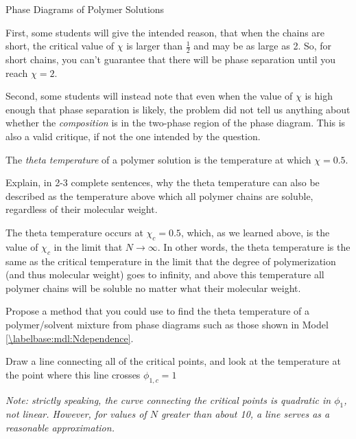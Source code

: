 \begin{activity}{Phase Diagrams of Polymer Solutions}
\begin{ctqs}
\begin{solution}[2.5in]
			First, some students will give the intended reason, that when the chains are short, the critical value of $\chi$ is larger than $\frac{1}{2}$ and may be as large as 2.  So, for short chains, you can't guarantee that there will be phase separation until you reach $\chi = 2$.
			
			Second, some students will instead note that even when the value of $\chi$ is high enough that phase separation is likely, the problem did not tell us anything about whether the \emph{composition} is in the two-phase region of the phase diagram.  This is also a valid critique, if not the one intended by the question.
		\end{solution}

\end{ctqs}


\begin{infobox}
	
	The \emph{theta temperature} of a polymer solution is the temperature at which $\chi=0.5$.
	
\end{infobox}


\begin{ctqs}

	\question Explain, in 2-3 complete sentences, why the theta temperature can also be described as the temperature above which all polymer chains are soluble, regardless of their molecular weight.
	
		\begin{solution}[2in]
			The theta temperature occurs at $\chi_c =0.5$, which, as we learned above, is the value of $\chi_c$ in the limit that $N\to\infty$.  In other words, the theta temperature is the same as the critical temperature in the limit that the degree of polymerization (and thus molecular weight) goes to infinity, and above this temperature all polymer chains will be soluble no matter what their molecular weight.
		\end{solution}
	
	\question Propose a method that you could use to find the theta temperature of a polymer/solvent mixture from phase diagrams such as those shown in Model \ref{\labelbase:mdl:Ndependence}.
	
		\begin{solution}[1.25in]
			Draw a line connecting all of the critical points, and look at the temperature at the point where this line crosses $\phi_{1,c} =1$
			
			\emph{Note: strictly speaking, the curve connecting the critical points is quadratic in $\phi_1$, not linear.  However, for values of $N$ greater than about 10, a line serves as a reasonable approximation.}
		\end{solution} 


\end{ctqs}
\end{activity}
